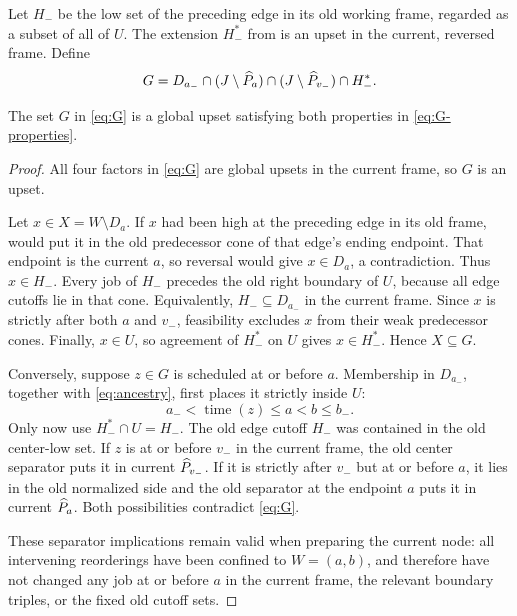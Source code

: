 Let \(H_-\) be the low set of the preceding edge in its old
working frame, regarded as a subset of all of \(U\).
The extension \(H_-^*\) from  is an upset in
the current, reversed frame. Define
\begin{equation}
 G=D_{a_-}\cap(J\setminus\widehat P_{a})
            \cap(J\setminus\widehat P_{v_-})\cap H_-^* .
 \label{eq:G}
\end{equation}

\begin{lemma}\label{lem:G}
The set \(G\) in \eqref{eq:G} is a global upset satisfying both
properties in \eqref{eq:G-properties}.
\end{lemma}
\begin{proof}
All four factors in \eqref{eq:G} are global upsets in the current
frame, so \(G\) is an upset.

Let \(x\in X=W\setminus D_a\).
If \(x\) had been high at the preceding edge in its old frame,
 would put it in the old predecessor cone
of that edge's ending endpoint. That endpoint is the current \(a\),
so reversal would give \(x\in D_a\), a contradiction.
Thus \(x\in H_-\).
Every job of \(H_-\) precedes the old right boundary of \(U\),
because all edge cutoffs lie in that cone. Equivalently,
\(H_-\subseteq D_{a_-}\) in the current frame.
Since \(x\) is strictly after both \(a\) and \(v_-\), feasibility
excludes \(x\) from their weak predecessor cones.
Finally, \(x\in U\), so agreement of \(H_-^*\) on \(U\) gives
\(x\in H_-^*\). Hence \(X\subseteq G\).

Conversely, suppose \(z\in G\) is scheduled at or before \(a\).
Membership in \(D_{a_-}\), together with \eqref{eq:ancestry},
first places it strictly inside \(U\):
\begin{equation}
 a_-<\operatorname{time}(z)\le a<b\le b_-.
 \label{eq:localize-U}
\end{equation}
Only now use \(H_-^*\cap U=H_-\).
The old edge cutoff \(H_-\) was contained in the old center-low
set. If \(z\) is at or before \(v_-\) in the current frame,
the old center separator puts it in current \(\widehat P_{v_-}\).
If it is strictly after \(v_-\) but at or before \(a\), it lies
in the old normalized side and the old separator at the endpoint
\(a\) puts it in current \(\widehat P_{a}\).
Both possibilities contradict \eqref{eq:G}.

These separator implications remain valid when preparing the current
node: all intervening reorderings have been confined to \(W=(a,b)\),
and therefore have not changed any job at or before \(a\) in the
current frame, the relevant boundary triples, or the fixed old
cutoff sets.
\end{proof}

